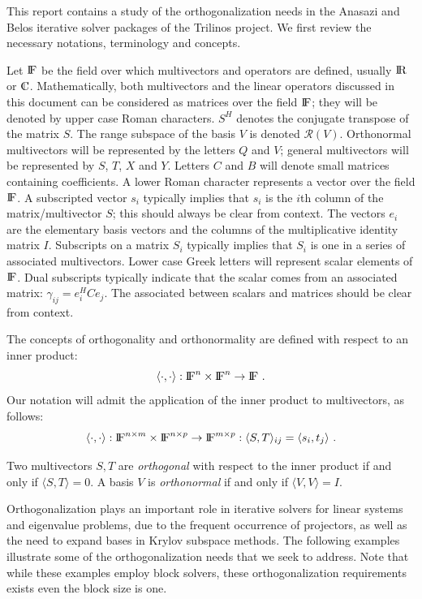 \documentclass[12pt,letterpaper]{SANDreport}
\theoremstyle{example}
\newcommand{\inner}[2]{\langle #1,#2 \rangle}
\newcommand{\range}[1]{\mathcal{R}(#1)}
\begin{document}
This report contains a study of the orthogonalization needs in the Anasazi and Belos
iterative solver packages of the Trilinos project. We first review the necessary
notations, terminology and concepts.

Let ${\rm I\kern-.16em F}$ be the field over which multivectors and operators are defined, usually ${\rm I\kern-.16em R}$ or
$\C$. Mathematically, both multivectors and the linear operators discussed in this
document can be considered as matrices over the field ${\rm I\kern-.16em F}$; they will be denoted by upper
case Roman characters. $S^H$ denotes the conjugate transpose of the matrix $S$. The range
subspace of the basis $V$ is denoted $\range{V}$. Orthonormal multivectors will be
represented by the letters $Q$ and $V$; general multivectors will be represented by $S$,
$T$, $X$ and $Y$. Letters $C$ and $B$ will denote small matrices containing coefficients.
A lower Roman character represents a vector over the field ${\rm I\kern-.16em F}$. A subscripted vector
$s_i$ typically implies that $s_i$ is the $i$th column of the matrix/multivector $S$; this
should always be clear from context. The vectors $e_i$ are the elementary basis vectors
and the columns of the multiplicative identity matrix $I$. Subscripts on a matrix
$S_i$ typically implies that $S_i$ is one in a series of associated multivectors. Lower
case Greek letters will represent scalar elements of ${\rm I\kern-.16em F}$. Dual subscripts typically indicate
that the scalar comes from an associated matrix: $\gamma_{ij} = e_i^H C e_j$. The
associated between scalars and matrices should be clear from context. 

The concepts of orthogonality and orthonormality are defined with respect to an
inner product:
\[
\inner{\cdot}{\cdot} : \F^n \times \F^n \rightarrow \F\ .
\]
Our notation will admit the application of the inner product to multivectors, as follows:
\[
\inner{\cdot}{\cdot} 
: \F^{n \times m} \times \F^{n \times p} \rightarrow \F^{m \times p}
: \inner{S}{T}_{ij} = \inner{s_i}{t_j}\ .
\]

Two multivectors $S, T$ are \emph{orthogonal} with respect to the inner product if and
only if $\inner{S}{T} = 0$. A basis $V$ is \emph{orthonormal} if and only if $\inner{V}{V}
= I$.

Orthogonalization plays an important role in iterative solvers for linear systems and
eigenvalue problems, due to the frequent occurrence of projectors, as well as the need to
expand bases in Krylov subspace methods. The following examples illustrate some of the
orthogonalization needs that we seek to address. Note that while these examples employ
block solvers, these orthogonalization requirements exists even the block size is one.
\end{document}
